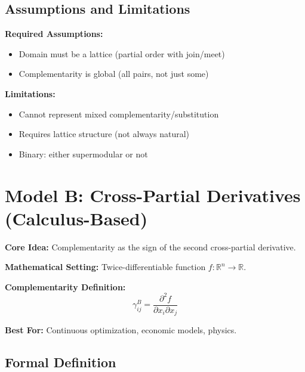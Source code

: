 \subsection{Assumptions and Limitations}

\textbf{Required Assumptions:}
\begin{itemize}
    \item Domain must be a lattice (partial order with join/meet)
    \item Complementarity is global (all pairs, not just some)
\end{itemize}

\textbf{Limitations:}
\begin{itemize}
    \item Cannot represent mixed complementarity/substitution
    \item Requires lattice structure (not always natural)
    \item Binary: either supermodular or not
\end{itemize}

\section{Model B: Cross-Partial Derivatives (Calculus-Based)}
\label{sec:model-b}

\begin{tcolorbox}[colback=green!5!white,colframe=green!75!black,title=\textbf{Model B Overview}]
\textbf{Core Idea:} Complementarity as the sign of the second cross-partial derivative.

\textbf{Mathematical Setting:} Twice-differentiable function $f: \mathbb{R}^n \to \mathbb{R}$.

\textbf{Complementarity Definition:}
\begin{equation}
\gamma^B_{ij} = \frac{\partial^2 f}{\partial x_i \partial x_j}
\end{equation}

\textbf{Best For:} Continuous optimization, economic models, physics.
\end{tcolorbox}

\subsection{Formal Definition}

